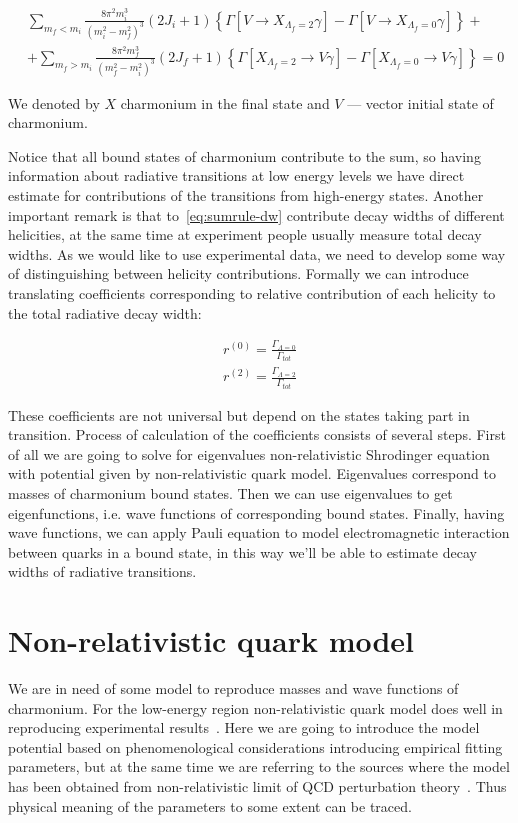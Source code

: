 \begin{align} \label{eq:sumrule-dw}
    &\sum_{m_f < m_i} \frac{8 \pi^2 m_i^3}{(m_i^2 - m_f^2)^3} (2J_i+1) \left\{\Gamma\left[V \rightarrow X_{\Lambda_f = 2} \gamma\right] - \Gamma\left[V \rightarrow X_{\Lambda_f = 0} \gamma\right] \right\} + \nonumber \\
    &+ \sum_{m_f > m_i} \frac{8 \pi^2 m_f^3}{(m_f^2 - m_i^2)^3} (2J_f+1) \left\{\Gamma\left[X_{\Lambda_f=2} \rightarrow V \gamma \right] - \Gamma\left[X_{\Lambda_f = 0} \rightarrow V\gamma \right] \right\} = 0
\end{align}

We denoted by $X$ charmonium in the final state and $V$ --- vector initial state of charmonium.

Notice that all bound states of charmonium contribute to the sum, so having information about radiative transitions at low energy levels we have direct estimate for contributions of the transitions from high-energy states. Another important remark is that to~\ref{eq:sumrule-dw} contribute decay widths of different helicities, at the same time at experiment people usually measure total decay widths. As we would like to use experimental data, we need to develop some way of distinguishing between helicity contributions. Formally we can introduce translating coefficients corresponding to relative contribution of each helicity to the total radiative decay width:

\begin{align}
    r^{(0)} = \frac{\Gamma_{\Lambda=0}}{\Gamma_{tot}} \\
    r^{(2)} = \frac{\Gamma_{\Lambda=2}}{\Gamma_{tot}}
\end{align}

These coefficients are not universal but depend on the states taking part in transition. Process of calculation of the coefficients consists of several steps. First of all we are going to solve for eigenvalues non-relativistic Shrodinger equation with potential given by non-relativistic quark model. Eigenvalues correspond to masses of charmonium bound states. Then we can use eigenvalues to get eigenfunctions, i.e. wave functions of corresponding bound states. Finally, having wave functions, we can apply Pauli equation to model electromagnetic interaction between quarks in a bound state, in this way we'll be able to estimate decay widths of radiative transitions.

\section{Non-relativistic quark model}
We are in need of some model to reproduce masses and wave functions of charmonium. For the low-energy region non-relativistic quark model does well in reproducing experimental results~\cite{deng-charm, deng-bot}. Here we are going to introduce the model potential based on phenomenological considerations introducing empirical fitting parameters, but at the same time we are referring to the sources where the model has been obtained from non-relativistic limit of QCD perturbation theory~\cite{nrqm-perturb}. Thus physical meaning of the parameters to some extent can be traced.

